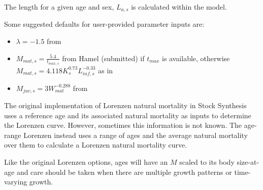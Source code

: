 The length for a given age and sex, $L_{a,s}$ is calculated within the model.

Some suggested defaults for user-provided parameter inputs are:
\begin{itemize}
 \item $\lambda = -1.5$ from \citet{gulland1987natural}
 \item $M_{mat,s}=\frac{5.4}{t_{max,s}}$ from Hamel (submitted) if $t_{max}$ is available, otherwise $M_{mat,s} = 4.118K_{s}^{0.73}L_{inf,s}^{-0.33}$ as in \citet{then2015evaluating} 
 \item $M_{juv,s} = 3W_{mat}^{-0.288}$ from \citet{lorenzen1996relationship}
\end{itemize}

The original implementation of Lorenzen natural mortality in Stock Synthesis uses a reference age and its associated natural mortality as inputs to determine the Lorenzen curve. However, sometimes this information is not known. The age-range Lorenzen instead uses a range of ages and the average natural mortality over them to calculate a Lorenzen natural mortality curve.

Like the original Lorenzen options, ages will have an $M$ scaled to its body size-at-age and care should be taken when there are multiple growth patterns or time-varying growth.

